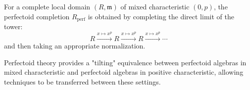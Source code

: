 \begin{definition}\label{def:perfectoid-completion}
For a complete local domain $(R,\mathfrak{m})$ of mixed characteristic $(0,p)$, the perfectoid completion $R_{\text{perf}}$ is obtained by completing the direct limit of the tower:
$$R \xrightarrow{x \mapsto x^p} R \xrightarrow{x \mapsto x^p} R \xrightarrow{x \mapsto x^p} \cdots$$
and then taking an appropriate normalization.
\end{definition}

Perfectoid theory provides a "tilting" equivalence between perfectoid algebras in mixed characteristic and perfectoid algebras in positive characteristic, allowing techniques to be transferred between these settings. 